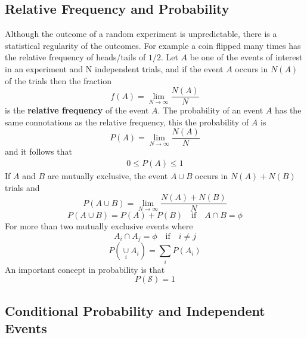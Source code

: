 \documentclass{article}
\begin{document}
    \subsection{Relative Frequency and Probability}
    Although the outcome of a random experiment is unpredictable, there is a statistical regularity of the outcomes.
    For example a coin flipped many times has the relative frequency of heads/tails of $1/2$. Let $A$ be one
    of the events of interest in an experiment and N independent trials, and if the event $A$ occurs in $N(A)$
    of the trials then the fraction 
    \begin{equation}
        f(A) = \lim_{N\rightarrow \infty}\frac{N(A)}{N}
    \end{equation}
    is the \textbf{relative frequency} of the event $A$. The probability of an event $A$ has the same connotations
    as the relative frequency, this the probability of $A$ is
    \begin{equation}
        P(A) = \lim_{N\rightarrow \infty}\frac{N(A)}{N}
    \end{equation} 
    and it follows that
    \begin{eqnarray}
        0 \le P(A) \le 1
    \end{eqnarray}
    If $A$ and $B$ are mutually exclusive, the event $A \cup B$ occurs in $N(A) + N(B)$ trials and
    \begin{equation}
        P(A \cup B) = \lim_{N\rightarrow \infty}\frac{N(A) + N(B)}{N}
    \end{equation}
    \begin{equation}
        P(A \cup B) = P(A) + P(B) \quad \textrm{if} \quad A \cap B = \phi
    \end{equation}
    For more than two mutually exclusive events where
    \begin{equation}
        A_i \cap A_j = \phi \quad \textrm{if} \quad i \neq j
    \end{equation}
    \begin{equation}
        P(\underset{i}{\cup}A_i) = \sum_iP(A_i)
    \end{equation}
    An important concept in probability is that
    \begin{equation}
       P(\mathcal{S}) = 1 
    \end{equation}

    \subsection{Conditional Probability and Independent Events}
\end{document}
